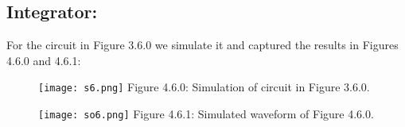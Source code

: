 \subsection{Integrator:}

For the circuit in Figure 3.6.0 we simulate it and captured the results in Figures 4.6.0 and 4.6.1:

\begin{figure}[H]
\texttt{[image: s6.png]}
\centering \linebreak \linebreak Figure 4.6.0: Simulation of circuit in Figure 3.6.0.
\end{figure} \hfill

\begin{figure}[H]
\texttt{[image: so6.png]}
\centering \linebreak \linebreak Figure 4.6.1: Simulated waveform of Figure 4.6.0.
\end{figure} \hfill

\pagebreak